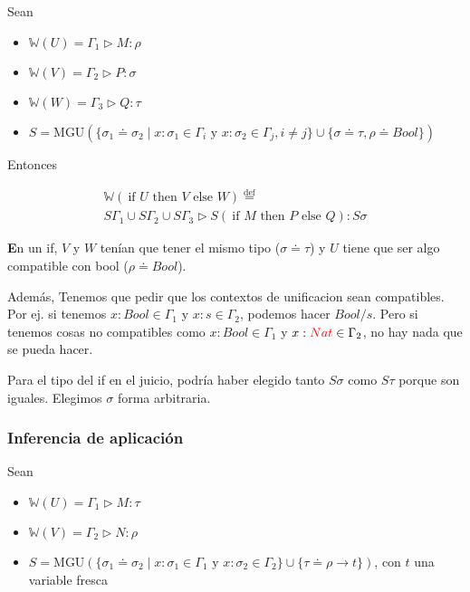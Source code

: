 \documentclass{report}
\theoremstyle{definition} %
\newenvironment{nota}[1]
    {\begin{leftbar}\textbf{#1}}
    {\end{leftbar}}
\newcommand{\eqdef}{\overset{\text{def}}{=}}
\newcommand{\tfunc}[2]{#1 \to #2}
\newcommand{\ifte}[3]{\ \text{if } #1 \text{ then } #2 \text{ else } #3}
\newcommand{\tipa}[3]{#1 \rhd #2 : #3} %
\newcommand{\changed}[1]{\textcolor{red}{#1}}
\newcommand{\tsust}[1]{S#1} %
\newcommand{\sustfor}[2]{#1/#2} %
\newcommand{\infer}[1]{\mathbb{W}(#1)}
\newcommand{\unify}[2]{#1 \doteq #2}
\begin{document}
Sean

\begin{itemize}
    \item $\infer{U} = \tipa{\Gamma_1}{M}{\rho}$
    \item $\infer{V} = \tipa{\Gamma_2}{P}{\sigma}$
    \item $\infer{W} = \tipa{\Gamma_3}{Q}{\tau}$
    \item
    $S = \text{MGU}(
        \{
            \unify{\sigma_1}{\sigma_2} \mid
            x : \sigma_1 \in \Gamma_i
            \text{ y } x : \sigma_2 \in \Gamma_j,
            i \neq j
        \}
        \cup \{ \unify{\sigma}{\tau}, \unify{\rho}{Bool} \}
    )$
\end{itemize}

Entonces

\begin{gather*}
    \infer{\ifte{U}{V}{W}} \eqdef\\
    \tipa
        {\tsust{\Gamma_1} \cup \tsust{\Gamma_2} \cup \tsust{\Gamma_3}}
        {\tsust{(\ifte{M}{P}{Q})}}
        {\tsust{\sigma}}
\end{gather*}

\begin{nota}
    En un if, $V$ y $W$ tenían que tener el mismo tipo ($\unify{\sigma}{\tau}$)
    y $U$ tiene que ser algo compatible con bool ($\unify{\rho}{Bool}$).

    Además, Tenemos que pedir que los contextos de unificacion sean compatibles.
    Por ej. si tenemos $x : Bool \in \Gamma_1$ y $x : s \in \Gamma_2$, podemos
    hacer $\sustfor{Bool}{s}$. Pero si tenemos cosas no compatibles como $x :
    Bool \in \Gamma_1$ y $x : \changed{Nat} \in \Gamma_2$, no hay nada que se
    pueda hacer.

    Para el tipo del if en el juicio, podría haber elegido tanto
    $\tsust{\sigma}$ como $\tsust{\tau}$ porque son iguales. Elegimos $\sigma$
   forma arbitraria.
\end{nota}

\subsubsection{Inferencia de aplicación}

Sean

\begin{itemize}
    \item $\infer{U} = \tipa{\Gamma_1}{M}{\tau}$
    \item $\infer{V} = \tipa{\Gamma_2}{N}{\rho}$
    \item $S = \text{MGU} (
        \{
            \unify{\sigma_1}{\sigma_2} \mid
            x : \sigma_1 \in \Gamma_1
            \text{ y } x : \sigma_2 \in \Gamma_2
        \}
        \cup \{ \unify{\tau}{\tfunc{\rho}{t}} \}
    )$, con $t$ una variable fresca
\end{itemize}
\end{document}
